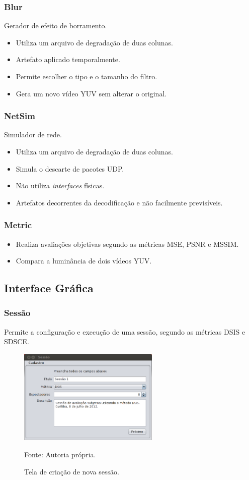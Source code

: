     \begin{frame}\frametitle{Blur}
        Gerador de efeito de borramento.
        \begin{itemize}
            \item Utiliza um arquivo de degradação de duas colunas.
            \item Artefato aplicado temporalmente.
            \item Permite escolher o tipo e o tamanho do filtro.
            \item Gera um novo vídeo YUV sem alterar o original.
        \end{itemize}
    \end{frame}
    
    \begin{frame}\frametitle{NetSim}
        Simulador de rede.
        \begin{itemize}
            \item Utiliza um arquivo de degradação de duas colunas.
            \item Simula o descarte de pacotes UDP.
            \item Não utiliza \emph{interfaces} físicas.
            \item Artefatos decorrentes da decodificação e não facilmente previsíveis. %
        \end{itemize}
    \end{frame}
    
    \begin{frame}\frametitle{Metric}
        \begin{itemize}
            \item Realiza avaliações objetivas segundo as métricas MSE, PSNR e MSSIM.
            \item Compara a luminância de dois vídeos YUV.
        \end{itemize}
    \end{frame}

\subsection{Interface Gráfica}
        \begin{frame}\frametitle{Sessão}
            Permite a configuração e execução de uma sessão, segundo as métricas DSIS e SDSCE.
		    \begin{figure}
			    \includegraphics[width=0.6\textwidth]{./imgs/sessao1.png}
			    \caption{Tela de criação de nova sessão.}
			    \tiny
			    Fonte: Autoria própria.
		    \end{figure}
        \end{frame}
        
